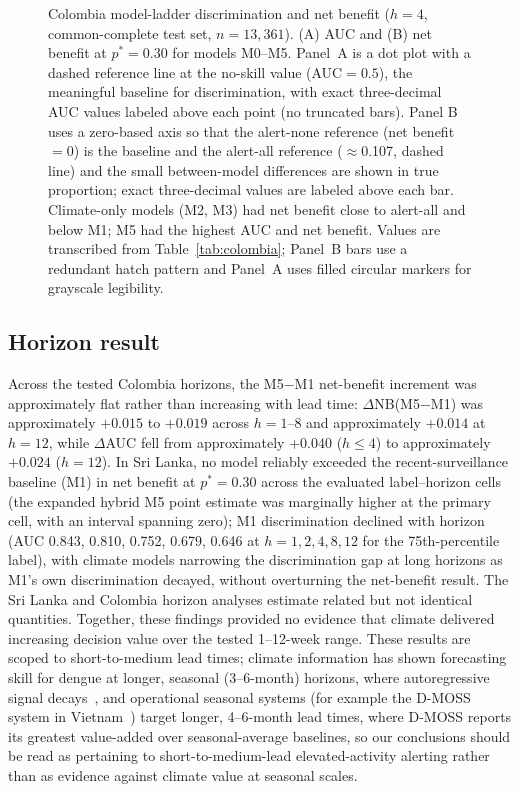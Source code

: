 \documentclass[11pt,a4paper]{article}
\begin{document}
\begin{figure}[htbp]
\begin{tikzpicture}
\end{tikzpicture}
\caption{Colombia model-ladder discrimination and net benefit ($h=4$, common-complete test set, $n=13{,}361$). (A) AUC and (B) net benefit at $p^*=0.30$ for models M0--M5. Panel~A is a dot plot with a dashed reference line at the no-skill value (AUC${}=0.5$), the meaningful baseline for discrimination, with exact three-decimal AUC values labeled above each point (no truncated bars). Panel B uses a zero-based axis so that the alert-none reference (net benefit $=0$) is the baseline and the alert-all reference ($\approx$0.107, dashed line) and the small between-model differences are shown in true proportion; exact three-decimal values are labeled above each bar. Climate-only models (M2, M3) had net benefit close to alert-all and below M1; M5 had the highest AUC and net benefit. Values are transcribed from Table~\ref{tab:colombia}; Panel~B bars use a redundant hatch pattern and Panel~A uses filled circular markers for grayscale legibility.}
\label{fig:colombia}
\end{figure}

\subsection{Horizon result}
Across the tested Colombia horizons, the M5$-$M1 net-benefit increment was approximately flat rather than increasing with lead time: $\Delta$NB(M5$-$M1) was approximately $+0.015$ to $+0.019$ across $h=1$--8 and approximately $+0.014$ at $h=12$, while $\Delta$AUC fell from approximately $+0.040$ ($h\le4$) to approximately $+0.024$ ($h=12$). In Sri Lanka, no model reliably exceeded the recent-surveillance baseline (M1) in net benefit at $p^*=0.30$ across the evaluated label--horizon cells (the expanded hybrid M5 point estimate was marginally higher at the primary cell, with an interval spanning zero); M1 discrimination declined with horizon (AUC 0.843, 0.810, 0.752, 0.679, 0.646 at $h=1,2,4,8,12$ for the 75th-percentile label), with climate models narrowing the discrimination gap at long horizons as M1's own discrimination decayed, without overturning the net-benefit result. The Sri Lanka and Colombia horizon analyses estimate related but not identical quantities. Together, these findings provided no evidence that climate delivered increasing decision value over the tested 1--12-week range. These results are scoped to short-to-medium lead times; climate information has shown forecasting skill for dengue at longer, seasonal (3--6-month) horizons, where autoregressive signal decays~\cite{Beal2025,ColonGonzalez2021}, and operational seasonal systems (for example the D-MOSS system in Vietnam~\cite{Campbell2026}) target longer, 4--6-month lead times, where D-MOSS reports its greatest value-added over seasonal-average baselines, so our conclusions should be read as pertaining to short-to-medium-lead elevated-activity alerting rather than as evidence against climate value at seasonal scales.
\end{document}
